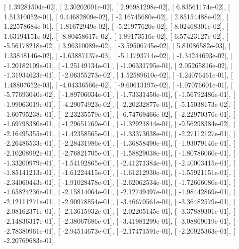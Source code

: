 \documentclass{article}
\begin{document}
       [  1.39281504e-02],
       [  2.30202091e-02],
       [  2.96981298e-02],
       [  6.83561174e-02],
       [  1.51310052e-01],
       [  9.44682809e-02],
       [ -2.16745680e-02],
       [  2.85154488e-02],
       [  1.22578684e-01],
       [  1.81672949e-02],
       [ -5.21977620e-02],
       [  8.02468301e-02],
       [  1.63194151e-02],
       [ -8.80458617e-02],
       [  1.89173516e-02],
       [  6.57423127e-02],
       [ -5.56178218e-02],
       [  3.96310089e-02],
       [ -3.59506745e-02],
       [  5.81086582e-03],
       [  1.33848146e-02],
       [ -1.63887137e-03],
       [ -5.11793714e-02],
       [ -1.34244693e-02],
       [ -1.20182109e-01],
       [ -1.25149134e-01],
       [ -1.06331795e-01],
       [  2.05265816e-02],
       [ -1.31934623e-01],
       [ -2.06355273e-02],
       [  1.52589610e-02],
       [ -1.24076461e-01],
       [  1.48807652e-03],
       [ -4.04336566e-02],
       [ -9.60613197e-02],
       [ -1.07076601e-01],
       [ -5.77693040e-02],
       [ -1.89706034e-01],
       [ -1.73331450e-01],
       [ -1.56792486e-01],
       [ -1.99063019e-01],
       [ -4.29074923e-02],
       [ -2.20232877e-01],
       [ -5.15038173e-02],
       [ -1.60795238e-01],
       [ -2.23235579e-01],
       [ -6.74769466e-02],
       [ -2.22970376e-01],
       [ -1.69798380e-01],
       [ -1.29651769e-01],
       [ -1.32921844e-01],
       [ -9.56298384e-02],
       [ -2.16495355e-01],
       [ -1.42358565e-01],
       [ -1.33373038e-01],
       [ -2.27112127e-01],
       [ -2.26486533e-01],
       [ -2.28431986e-01],
       [ -1.36858490e-01],
       [ -1.93079146e-01],
       [ -2.10208992e-01],
       [ -2.76821705e-01],
       [ -1.58829038e-01],
       [ -1.80786060e-01],
       [ -1.33200979e-01],
       [ -1.54192865e-01],
       [ -2.41271384e-01],
       [ -2.40003415e-01],
       [ -1.85141213e-01],
       [ -1.61224415e-01],
       [ -1.61212930e-01],
       [ -1.55921151e-01],
       [ -2.34060443e-01],
       [ -1.91028478e-01],
       [ -2.62062534e-01],
       [ -1.72666080e-01],
       [ -1.65824236e-01],
       [ -2.15814064e-01],
       [ -2.12749497e-01],
       [ -1.98442869e-01],
       [ -2.12111271e-01],
       [ -2.90978854e-01],
       [ -3.46670561e-01],
       [ -3.36482579e-01],
       [ -2.08162371e-01],
       [ -2.13615932e-01],
       [ -2.02205145e-01],
       [ -3.37889301e-01],
       [ -2.14836317e-01],
       [ -2.38067686e-01],
       [ -3.41981299e-01],
       [ -3.08869019e-01],
       [ -2.78380961e-01],
       [ -2.94514673e-01],
       [ -2.17471591e-01],
       [ -2.20925363e-01],
       [ -2.20769683e-01],
\end{document}
